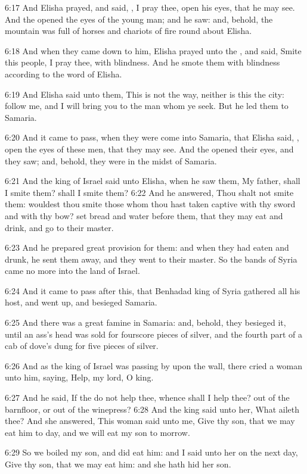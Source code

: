 6:17 And Elisha prayed, and said, \LORD, I pray thee, open his eyes, that he may see. And the \LORD opened the eyes of the young man; and he saw: and, behold, the mountain was full of horses and chariots of fire round about Elisha.

6:18 And when they came down to him, Elisha prayed unto the \LORD, and said, Smite this people, I pray thee, with blindness. And he smote them with blindness according to the word of Elisha.

6:19 And Elisha said unto them, This is not the way, neither is this the city: follow me, and I will bring you to the man whom ye seek. But he led them to Samaria.

6:20 And it came to pass, when they were come into Samaria, that Elisha said, \LORD, open the eyes of these men, that they may see. And the \LORD opened their eyes, and they saw; and, behold, they were in the midst of Samaria.

6:21 And the king of Israel said unto Elisha, when he saw them, My father, shall I smite them? shall I smite them?  6:22 And he answered, Thou shalt not smite them: wouldest thou smite those whom thou hast taken captive with thy sword and with thy bow? set bread and water before them, that they may eat and drink, and go to their master.

6:23 And he prepared great provision for them: and when they had eaten and drunk, he sent them away, and they went to their master. So the bands of Syria came no more into the land of Israel.

6:24 And it came to pass after this, that Benhadad king of Syria gathered all his host, and went up, and besieged Samaria.

6:25 And there was a great famine in Samaria: and, behold, they besieged it, until an ass's head was sold for fourscore pieces of silver, and the fourth part of a cab of dove's dung for five pieces of silver.

6:26 And as the king of Israel was passing by upon the wall, there cried a woman unto him, saying, Help, my lord, O king.

6:27 And he said, If the \LORD do not help thee, whence shall I help thee?  out of the barnfloor, or out of the winepress?  6:28 And the king said unto her, What aileth thee? And she answered, This woman said unto me, Give thy son, that we may eat him to day, and we will eat my son to morrow.

6:29 So we boiled my son, and did eat him: and I said unto her on the next day, Give thy son, that we may eat him: and she hath hid her son.

